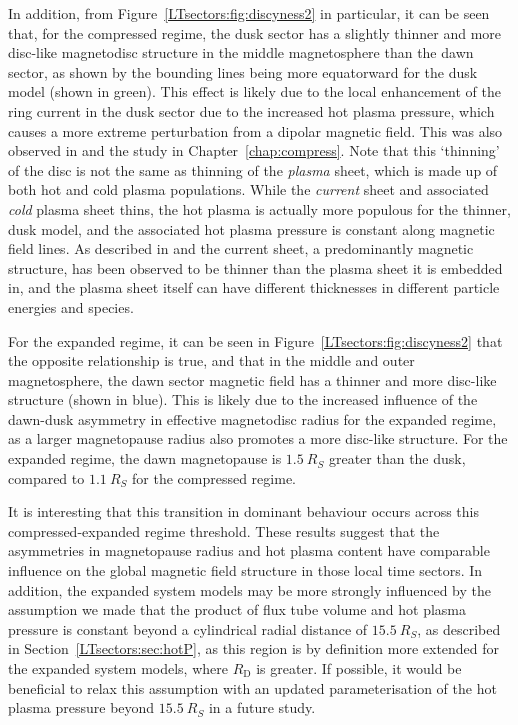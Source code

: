 In addition, from Figure~\ref{LTsectors:fig:discyness2} in particular, it can be seen that, for the compressed regime, the dusk sector has a slightly thinner and more disc-like magnetodisc structure in the middle magnetosphere than the dawn sector, as shown by the bounding lines being more equatorward for the dusk model (shown in green). This effect is likely due to the local enhancement of the ring current in the dusk sector due to the increased hot plasma pressure, which causes a more extreme perturbation from a dipolar magnetic field. This was also observed in \citet{achilleos2010b} and the study in Chapter~\ref{chap:compress}. Note that this `thinning' of the disc is not the same as thinning of the \textit{plasma} sheet, which is made up of both hot and cold plasma populations. While the \textit{current} sheet and associated \textit{cold} plasma sheet thins, the hot plasma is actually more populous for the thinner, dusk model, and the associated hot plasma pressure is constant along magnetic field lines. As described in \citet{sergis2011} and \citet{arridge2009b} the current sheet, a predominantly magnetic structure, has been observed to be thinner than the plasma sheet it is embedded in, and the plasma sheet itself can have different thicknesses in different particle energies and species.

For the expanded regime, it can be seen in Figure~\ref{LTsectors:fig:discyness2} that the opposite relationship is true, and that in the middle and outer magnetosphere, the dawn sector magnetic field has a thinner and more disc-like structure (shown in blue). This is likely due to the increased influence of the dawn-dusk asymmetry in effective magnetodisc radius for the expanded regime, as a larger magnetopause radius also promotes a more disc-like structure. For the expanded regime, the dawn magnetopause is $\SI{1.5}{R_S}$ greater than the dusk, compared to $\SI{1.1}{R_S}$ for the compressed regime. 

It is interesting that this transition in dominant behaviour occurs across this compressed-expanded regime threshold. These results suggest that the asymmetries in magnetopause radius and hot plasma content have comparable influence on the global magnetic field structure in those local time sectors. In addition, the expanded system models may be more strongly influenced by the assumption we made that the product of flux tube volume and hot plasma pressure is constant beyond a cylindrical radial distance of $\SI{15.5}{R_S}$, as described in Section~\ref{LTsectors:sec:hotP}, as this region is by definition more extended for the expanded system models, where $R_\mathrm{D}$ is greater. If possible, it would be beneficial to relax this assumption with an updated parameterisation of the hot plasma pressure beyond $\SI{15.5}{R_S}$ in a future study.

